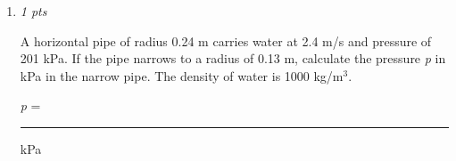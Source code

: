 \documentclass[11pt]{article}
\begin{document}
\begin{enumerate}[leftmargin=*,label=\textbf{Question \arabic*.}]
A chamber 51 m beneath the Earth contains hot water with a density of 1000 kg/m$^{3}$ at a pressure of 729,924 Pa. A narrowing channel leads upwards to a circular vent at the surface having negligible area compared to that of the chamber. At what speed is hot water ejected from the vent? Atmospheric pressure is 1.01 x 10$^{5}$ Pa



\emph{v }= \rule{2cm}{0.4pt} m/s

\item \hfill \textit{1 pts}

A horizontal pipe of radius 0.24 m carries water at 2.4 m/s and pressure of 201 kPa. If the pipe narrows to a radius of 0.13 m, calculate the pressure \emph{p} in kPa in the narrow pipe. The density of water is 1000 kg/m$^{3}$.



\emph{p} = \rule{2cm}{0.4pt} kPa

\end{enumerate}
\end{document}
